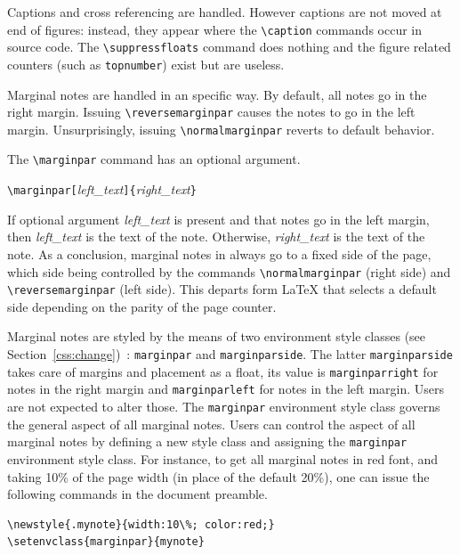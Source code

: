 Captions and cross referencing are handled.
However captions are not moved at end of figures: instead, they appear
where the \verb+\caption+ commands occur in source code.
The \verb+\suppressfloats+ command does nothing and the
figure related counters (such as \verb+topnumber+) exist but are useless.

%
%
%
\reversemarginpar%
\normalmarginpar%
Marginal notes are handled in an \hevea{} specific way.
By default, all notes go in the right margin.
Issuing \verb+\reversemarginpar+ causes the notes to go in the left
margin. Unsurprisingly, issuing \verb+\normalmarginpar+ reverts to
default behavior.

The \verb+\marginpar+ command has an optional argument.
\begin{flushleft}
\quad\verb+\marginpar[+\textit{left\_text}\verb+]{+\textit{right\_text}\verb+}+
\end{flushleft}
If optional argument \textit{left\_text} is present and that notes
go in the left margin, then \textit{left\_text} is the text of the
note. Otherwise, \textit{right\_text} is the text of the note.
As a conclusion, marginal notes in \hevea{} always go to a fixed side
of the page, which side being controlled by the commands
\verb+\normalmarginpar+ (right side) and \verb+\reversemarginpar+
(left side). This departs form \LaTeX{} that selects a default side
depending on the parity of the page counter.

Marginal notes are styled by the means of two environment style
classes (see Section~\ref{css:change})~:
\verb+marginpar+ and \verb+marginparside+.
The latter \verb+marginparside+ takes care of margins and placement as
a float, its value is \verb+marginparright+ for notes in the right
margin and \verb+marginparleft+ for notes in the left margin.
Users are not expected to alter those.
The \verb+marginpar+ environment style class governs the general
aspect of all marginal notes.
Users can control the aspect of all marginal notes by defining a new
style class and assigning the \verb+marginpar+ environment style
class.
For instance, to get all marginal notes in red font,
and taking 10\% of the page width (in place of the default
20\%),
one can issue the following commands in the document preamble.
\begin{verbatim}
\newstyle{.mynote}{width:10\%; color:red;}
\setenvclass{marginpar}{mynote}
\end{verbatim}


